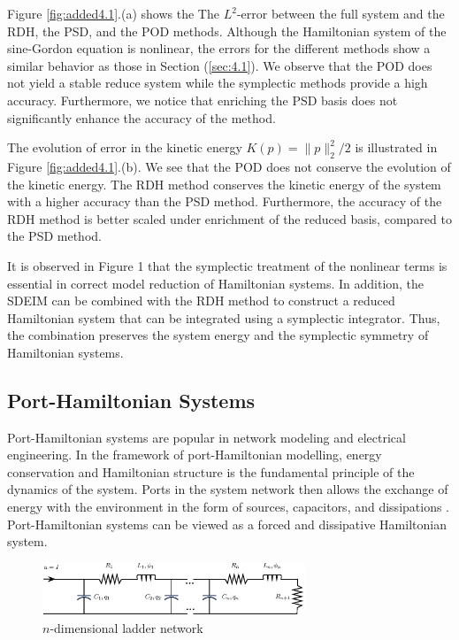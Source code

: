 Figure \ref{fig:added4.1}.(a) shows the The $L^2$-error between the full system and the RDH, the PSD, and the POD methods. Although the Hamiltonian system of the sine-Gordon equation is nonlinear, the errors for the different methods show a similar behavior as those in Section (\ref{sec:4.1}). We observe that the POD does not yield a stable reduce system while the symplectic methods provide a high accuracy. Furthermore, we notice that enriching the PSD basis does not significantly enhance the accuracy of the method.

The evolution of error in the kinetic energy $K(p) = \|p\|_2^2/2$ is illustrated in Figure \ref{fig:added4.1}.(b). We see that the POD does not conserve the evolution of the kinetic energy. The RDH method conserves the kinetic energy of the system with a higher accuracy than the PSD method. Furthermore, the accuracy of the RDH method is better scaled under enrichment of the reduced basis, compared to the PSD method. 

It is observed in Figure 1 that the symplectic treatment of the nonlinear terms is essential in correct model reduction of Hamiltonian systems. In addition, the SDEIM can be combined with the RDH method to construct a reduced Hamiltonian system that can be integrated using a symplectic integrator. Thus, the combination preserves the system energy and the symplectic symmetry of Hamiltonian systems.

\subsection{Port-Hamiltonian Systems}
Port-Hamiltonian systems are popular in network modeling and electrical engineering. In the framework of port-Hamiltonian modelling, energy conservation and Hamiltonian structure is the fundamental principle of the dynamics of the system. Ports in the system network then allows the exchange of energy with the environment in the form of sources, capacitors, and dissipations \cite{vanderSchaft:2014:PST:2693645.2693646}. Port-Hamiltonian systems can be viewed as a forced and dissipative Hamiltonian system.
\begin{figure}[t]
\begin{center}
	\includegraphics[width=0.7\textwidth]{./images/paper3/porthamil/circuit}
\end{center}
\caption{$n$-dimensional ladder network} \label{fig:4.2}
\end{figure}


